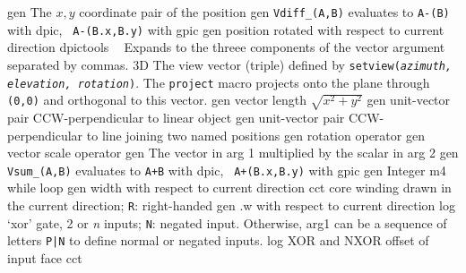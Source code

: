 %
  {gen}%
  {The $x, y$ coordinate pair of the position}%
%
  {gen}%
  {{\tt Vdiff\_(A,B)} evaluates to {\tt A-(B)} with dpic, {\tt
  A-(B.x,B.y)}%
   with gpic}%
%
  {gen}%
  {position rotated with respect to current direction}%
%
  {dpictools}%
  {$\;\;$ Expands to the threee components of the vector argument separated
    by commas.}%
%
  {3D} {The view vector (triple) defined by {\tt setview({\sl azimuth,
   elevation, rotation})}. The {\tt project} macro projects onto the plane
   through {\tt (0,0)} and orthogonal to this vector.}%
%
  {gen}%
  {vector length $\sqrt{x^2+y^2}$}%
%
  {gen}%
  {unit-vector pair CCW-perpendicular to linear object}%
%
  {gen}%
  {unit-vector pair CCW-perpendicular to line joining two named
  positions}%
%
  {gen}%
  {rotation operator}%
%
  {gen}%
  {vector scale operator}%
%
  {gen}%
  {The vector in arg 1 multiplied by the scalar in arg 2}%
%
  {gen}%
  {{\tt Vsum\_(A,B)} evaluates to {\tt A+B} with dpic, {\tt
  A+(B.x,B.y)}%
   with gpic}%
%
%
%
  {gen}%
  {Integer m4 while loop}%
%
  {gen}%
  {width with respect to current direction}%
%
  {cct}%
  {core winding drawn in the current direction; {\tt R}: right-handed
   }%
%
  {gen}%
  {.w with respect to current direction}%
%
  {log}%
  {`xor' gate, 2 or {\sl n\/} inputs; {\tt N}: negated input.
   Otherwise, arg1 can be a sequence of letters {\tt P|N} to define
   normal or negated inputs.
    }%
%
  {log}%
  {XOR and NXOR offset of input face}%
%
%
%
  {cct}%

